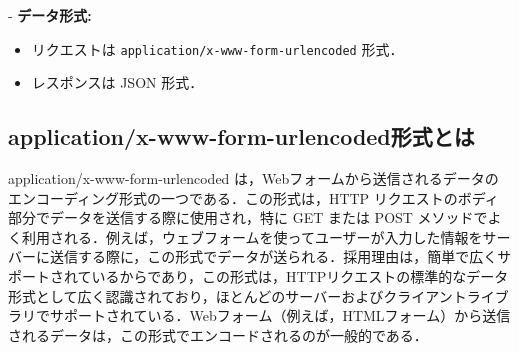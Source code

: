 \documentclass[uplatex,dvipdfmx]{jsarticle}
\begin{document}
- \textbf{データ形式:}
  \begin{itemize}
    \item リクエストは \texttt{application/x-www-form-urlencoded} 形式．
    \item レスポンスは JSON 形式．
  \end{itemize}
  
\subsection*{application/x-www-form-urlencoded形式とは}
application/x-www-form-urlencoded は，Webフォームから送信されるデータのエンコーディング形式の一つである．この形式は，HTTP リクエストのボディ部分でデータを送信する際に使用され，特に GET または POST メソッドでよく利用される．例えば，ウェブフォームを使ってユーザーが入力した情報をサーバーに送信する際に，この形式でデータが送られる．採用理由は，簡単で広くサポートされているからであり，この形式は，HTTPリクエストの標準的なデータ形式として広く認識されており，ほとんどのサーバーおよびクライアントライブラリでサポートされている．Webフォーム（例えば，HTMLフォーム）から送信されるデータは，この形式でエンコードされるのが一般的である．
\end{document}
